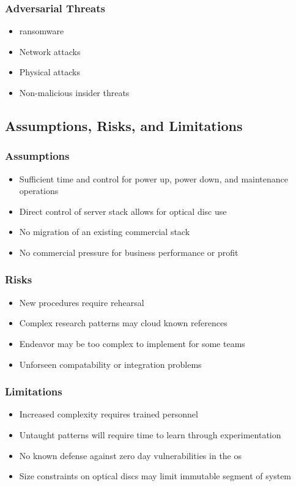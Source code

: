 \subsubsection{Adversarial Threats}
\begin{itemize}
	\item \gls{ransomware}
	\item Network attacks
	\item Physical attacks
	\item Non-malicious insider threats
\end{itemize}

\subsection{Assumptions, Risks, and Limitations}
\subsubsection{Assumptions}
\begin{itemize}
	\item Sufficient time and control for power up, power down, and maintenance operations
	\item Direct control of server stack allows for optical disc use
	\item No migration of an existing commercial stack
	\item No commercial pressure for business performance or profit
\end{itemize}
\subsubsection{Risks}
\begin{itemize}
	\item New procedures require rehearsal
	\item Complex research patterns may cloud known references
	\item Endeavor may be too complex to implement for some teams
	\item Unforseen compatability or integration problems
\end{itemize}
\subsubsection{Limitations}
\begin{itemize}
	\item Increased complexity requires trained personnel
	\item Untaught patterns will require time to learn through experimentation
	\item No known defense against zero day vulnerabilities in the \gls{os}
	\item Size constraints on optical discs may limit immutable segment of system
\end{itemize}

